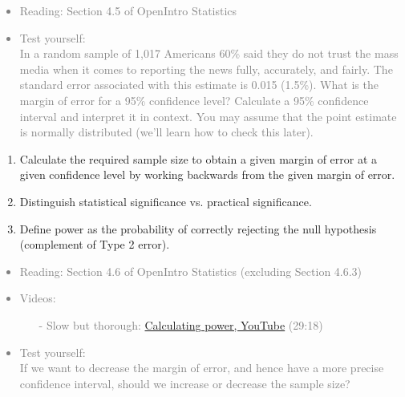 \documentclass[11pt]{article}
\newcommand{\gray}[1]{\textcolor{gray}{#1}}
\begin{document}
\gray{
{\it
\vspace{-0.5cm}
\begin{itemize}
\renewcommand{\labelitemi}{{\textcolor{dark}{$\ast$}}}
\item Reading: Section 4.5 of OpenIntro Statistics
\item Test yourself: \\
{\small
In a random sample of 1,017 Americans 60\% said they do not trust the mass media when it comes to reporting the news fully, accurately, and fairly. The standard error associated with this estimate is 0.015 (1.5\%). What is the margin of error for a 95\% confidence level? Calculate a 95\% confidence interval and interpret it in context. You may assume that the point estimate is normally distributed (we'll learn how to check this later).
}
\end{itemize}
}}

%

\vspace{0.5cm}

%

\begin{enumerate}[resume]
\renewcommand\labelenumi{\textcolor{light}{\textbf{LO \theenumi.}}}

\item Calculate the required sample size to obtain a given margin of error at a given confidence level by working backwards from the given margin of error.

\item Distinguish statistical significance vs. practical significance.

\item Define power as the probability of correctly rejecting the null hypothesis (complement of Type 2 error).

\end{enumerate}

\gray{
{\it
\vspace{-0.5cm}
\begin{itemize}
\renewcommand{\labelitemi}{{\textcolor{dark}{$\ast$}}}
\item Reading: Section 4.6 of OpenIntro Statistics (excluding Section 4.6.3)
\item Videos:
\begin{itemize}
\item[-] Slow but thorough: \href{http://www.youtube.com/watch?v=QW9_T8nrApU}{Calculating power, YouTube} (29:18)
\end{itemize}
\item Test yourself: \\
{\small
If we want to decrease the margin of error, and hence have a more precise confidence interval, should we increase or decrease the sample size?
}
\end{itemize}
}}
\end{document}
